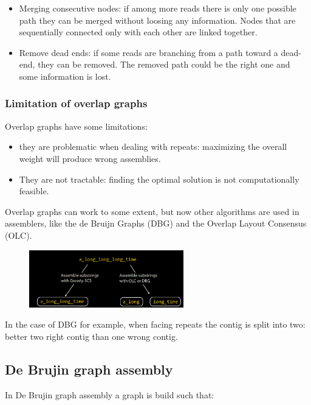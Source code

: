 \begin{multicols}{2}
    \begin{itemize}
        \item Merging consecutive nodes: if among more reads there is only one possible path they can be merged without loosing any information.
            Nodes that are sequentially connected only with each other are linked together.
        \item  Remove dead ends: if some reads are branching from a path toward a dead-end, they can be removed.
            The removed path could be the right one and some information is lost.
    \end{itemize}
\end{multicols}

\subsubsection{Limitation of overlap graphs}
Overlap graphs have some limitations:

\begin{itemize}
    \item they are problematic when dealing with repeats: maximizing the overall weight will produce wrong assemblies.
    \item They are not tractable: finding the optimal solution is not computationally feasible.
\end{itemize}

Overlap graphs can work to some extent, but now other algorithms are used in assemblers, like the de Bruijn Graphs (DBG) and the Overlap Layout Consensus (OLC).

\begin{figure}[h]
\centering
\includegraphics[width=0.6\textwidth]{DBG.png}
\caption{}
\end{figure}

In the case of DBG for example, when facing repeats the contig is split into two: better two right contig than one wrong contig.

\subsection{De Brujin graph assembly}
In De Brujin graph assembly a graph is build such that:

